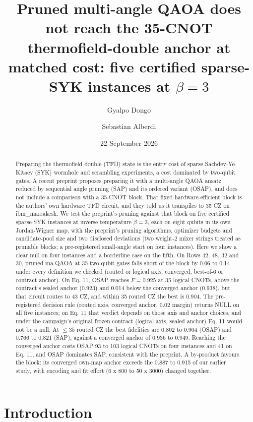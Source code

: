 \documentclass[11pt]{article}
\title{Pruned multi-angle QAOA does not reach the 35-CNOT thermofield-double anchor at matched cost: five certified sparse-SYK instances at $\beta = 3$}
\author{Gyalpo Dongo \and Sebastian Alberdi}
\date{22 September 2026}
\begin{document}
\maketitle

\begin{abstract}
Preparing the thermofield double (TFD) state is the entry cost of sparse Sachdev-Ye-Kitaev (SYK) wormhole and scrambling experiments, a cost dominated by two-qubit gates. A recent preprint proposes preparing it with a multi-angle QAOA ansatz reduced by sequential angle pruning (SAP) and its ordered variant (OSAP), and does not include a comparison with a 35-CNOT block. That fixed hardware-efficient block is the authors' own hardware TFD circuit, and they told us it transpiles to 35 CZ on ibm\_marrakesh. We test the preprint's pruning against that block on five certified sparse-SYK instances at inverse temperature $\beta = 3$, each on eight qubits in its own Jordan-Wigner map, with the preprint's pruning algorithms, optimizer budgets and candidate-pool size and two disclosed deviations (two weight-2 mixer strings treated as prunable blocks; a pre-registered small-angle start on four instances). Here we show a clear null on four instances and a borderline case on the fifth. On Rows 42, 48, 32 and 30, pruned ma-QAOA at 35 two-qubit gates falls short of the block by 0.06 to 0.14 under every definition we checked (routed or logical axis; converged, best-of-6 or contract anchor). On Eq. 11, OSAP reaches $F = 0.925$ at 35 logical CNOTs, above the contract's sealed anchor (0.923) and 0.014 below the converged anchor (0.938), but that circuit routes to 43 CZ, and within 35 routed CZ the best is 0.904. The pre-registered decision rule (routed axis, converged anchor, 0.02 margin) returns NULL on all five instances; on Eq. 11 that verdict depends on those axis and anchor choices, and under the campaign's original frozen contract (logical axis, sealed anchor) Eq. 11 would not be a null. At $\leq 35$ routed CZ the best fidelities are 0.802 to 0.904 (OSAP) and 0.766 to 0.821 (SAP), against a converged anchor of 0.936 to 0.949. Reaching the converged anchor costs OSAP 93 to 103 logical CNOTs on four instances and 41 on Eq. 11, and OSAP dominates SAP, consistent with the preprint. A by-product favours the block: its converged own-map anchor exceeds the 0.887 to 0.915 of our earlier study, with encoding and fit effort (6 x 800 to 50 x 3000) changed together.
\end{abstract}

\section{Introduction}
\end{document}
